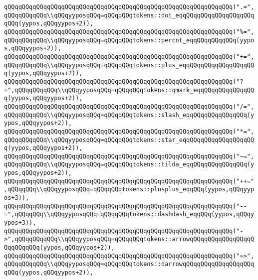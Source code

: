 \verb|qQQqqQQqqQQqqQQqqQQqqQQqqQQqqQQqqQQqqQQqqQQqqQQqqQQqqQQqqQQqqQQq(".=",qQQqqQQqqQQq\\qQQqyyposqQQq=qQQqqQQqtokens::dot_eqqQQqqQQqqQQqqQQqqQQqqQQq(yypos,qQQqyypos+2)),|\newline
\verb|qQQqqQQqqQQqqQQqqQQqqQQqqQQqqQQqqQQqqQQqqQQqqQQqqQQqqQQqqQQqqQQq("%=",qQQqqQQqqQQq\\qQQqyyposqQQq=qQQqqQQqtokens::percnt_eqqQQqqQQqqQQq(yypos,qQQqyypos+2)),|\newline
\verb|qQQqqQQqqQQqqQQqqQQqqQQqqQQqqQQqqQQqqQQqqQQqqQQqqQQqqQQqqQQqqQQq("+=",qQQqqQQqqQQq\\qQQqyyposqQQq=qQQqqQQqtokens::plus_eqqQQqqQQqqQQqqQQqqQQq(yypos,qQQqyypos+2)),|\newline
\verb|qQQqqQQqqQQqqQQqqQQqqQQqqQQqqQQqqQQqqQQqqQQqqQQqqQQqqQQqqQQqqQQq("?=",qQQqqQQqqQQq\\qQQqyyposqQQq=qQQqqQQqtokens::qmark_eqqQQqqQQqqQQqqQQq(yypos,qQQqyypos+2)),|\newline
\verb|qQQqqQQqqQQqqQQqqQQqqQQqqQQqqQQqqQQqqQQqqQQqqQQqqQQqqQQqqQQqqQQq("/=",qQQqqQQqqQQq\\qQQqyyposqQQq=qQQqqQQqtokens::slash_eqqQQqqQQqqQQqqQQq(yypos,qQQqyypos+2)),|\newline
\verb|qQQqqQQqqQQqqQQqqQQqqQQqqQQqqQQqqQQqqQQqqQQqqQQqqQQqqQQqqQQqqQQq("*=",qQQqqQQqqQQq\\qQQqyyposqQQq=qQQqqQQqtokens::star_eqqQQqqQQqqQQqqQQqqQQq(yypos,qQQqyypos+2)),|\newline
\verb|qQQqqQQqqQQqqQQqqQQqqQQqqQQqqQQqqQQqqQQqqQQqqQQqqQQqqQQqqQQqqQQq("~=",qQQqqQQqqQQq\\qQQqyyposqQQq=qQQqqQQqtokens::tilda_eqqQQqqQQqqQQqqQQq(yypos,qQQqyypos+2)),|\newline
\verb|qQQqqQQqqQQqqQQqqQQqqQQqqQQqqQQqqQQqqQQqqQQqqQQqqQQqqQQqqQQqqQQq("++=",qQQqqQQq\\qQQqyyposqQQq=qQQqqQQqtokens::plusplus_eqqQQq(yypos,qQQqyypos+3)),|\newline
\verb|qQQqqQQqqQQqqQQqqQQqqQQqqQQqqQQqqQQqqQQqqQQqqQQqqQQqqQQqqQQqqQQq("--=",qQQqqQQq\\qQQqyyposqQQq=qQQqqQQqtokens::dashdash_eqqQQq(yypos,qQQqyypos+3)),|\newline
\verb|qQQqqQQqqQQqqQQqqQQqqQQqqQQqqQQqqQQqqQQqqQQqqQQqqQQqqQQqqQQqqQQq("->",qQQqqQQqqQQq\\qQQqyyposqQQq=qQQqqQQqtokens::arrowqQQqqQQqqQQqqQQqqQQqqQQqqQQq(yypos,qQQqyypos+2)),|\newline
\verb|qQQqqQQqqQQqqQQqqQQqqQQqqQQqqQQqqQQqqQQqqQQqqQQqqQQqqQQqqQQqqQQq("=>",qQQqqQQqqQQq\\qQQqyyposqQQq=qQQqqQQqtokens::darrowqQQqqQQqqQQqqQQqqQQqqQQq(yypos,qQQqyypos+2)),|\newline
